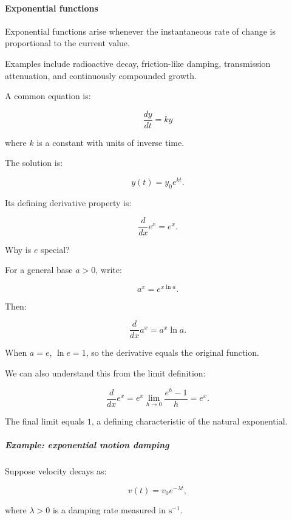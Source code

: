 \paragraph{Exponential functions}\label{01-foundations-i-ch020-exponential-functions}

\hypertarget{01-foundations-i-ch020-exponential-functions}{}

Exponential functions arise whenever the instantaneous rate of change is proportional to the current value.

Examples include radioactive decay, friction-like damping, transmission attenuation, and continuously compounded growth.

A common equation is:

\[
\frac{dy}{dt}=ky
\]

where \(k\) is a constant with units of inverse time.

The solution is:

\[
y(t)=y_0e^{kt}.
\]

Its defining derivative property is:

\[
\boxed{\frac d{dx}e^x=e^x}.
\]

Why is \(e\) special?

For a general base \(a>0\), write:

\[
a^x=e^{x\ln a}.
\]

Then:

\[
\boxed{\frac d{dx}a^x=a^x\ln a}.
\]

When \(a=e\), \(\ln e=1\), so the derivative equals the original function.

We can also understand this from the limit definition:

\[
\frac d{dx}e^x =e^x\lim_{h\to0}\frac{e^h-1}{h} =e^x.
\]

The final limit equals \(1\), a defining characteristic of the natural exponential.

\begin{allmightroleexample}

\subparagraph{Example: exponential motion damping}\label{01-foundations-i-ch020-example-exponential-motion-damping}

\hypertarget{01-foundations-i-ch020-example-exponential-motion-damping}{}

Suppose velocity decays as:

\end{allmightroleexample}

\[
v(t)=v_0e^{-\lambda t},
\]

where \(\lambda>0\) is a damping rate measured in \(\mathrm{s}^{-1}\).

